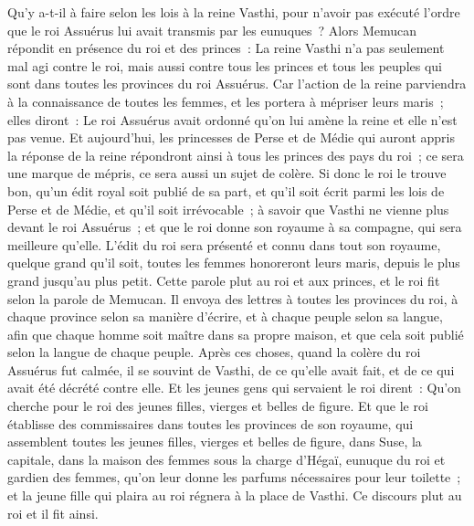 \begin{multicols}{2}
Qu'y a-t-il à faire selon les lois à la reine Vasthi, pour n'avoir pas exécuté l'ordre que le roi Assuérus lui avait transmis par les eunuques~?
Alors Memucan répondit en présence du roi et des princes~: La reine Vasthi n'a pas seulement mal agi contre le roi, mais aussi contre tous les princes et tous les peuples qui sont dans toutes les provinces du roi Assuérus.
Car l'action de la reine parviendra à la connaissance de toutes les femmes, et les portera à mépriser leurs maris~; elles diront~: Le roi Assuérus avait ordonné qu'on lui amène la reine et elle n'est pas venue.
Et aujourd'hui, les princesses de Perse et de Médie qui auront appris la réponse de la reine répondront ainsi à tous les princes des pays du roi~; ce sera une marque de mépris, ce sera aussi un sujet de colère.
Si donc le roi le trouve bon, qu'un édit royal soit publié de sa part, et qu'il soit écrit parmi les lois de Perse et de Médie, et qu'il soit irrévocable~; à savoir que Vasthi ne vienne plus devant le roi Assuérus~; et que le roi donne son royaume à sa compagne, qui sera meilleure qu'elle.
L'édit du roi sera présenté et connu dans tout son royaume, quelque grand qu'il soit, toutes les femmes honoreront leurs maris, depuis le plus grand jusqu'au plus petit.
Cette parole plut au roi et aux princes, et le roi fit selon la parole de Memucan.
Il envoya des lettres à toutes les provinces du roi, à chaque province selon sa manière d'écrire, et à chaque peuple selon sa langue, afin que chaque homme soit maître dans sa propre maison, et que cela soit publié selon la langue de chaque peuple.
\VerseOne{}Après ces choses, quand la colère du roi Assuérus fut calmée, il se souvint de Vasthi, de ce qu'elle avait fait, et de ce qui avait été décrété contre elle.
Et les jeunes gens qui servaient le roi dirent~: Qu'on cherche pour le roi des jeunes filles, vierges et belles de figure.
Et que le roi établisse des commissaires dans toutes les provinces de son royaume, qui assemblent toutes les jeunes filles, vierges et belles de figure, dans Suse, la capitale, dans la maison des femmes sous la charge d'Hégaï, eunuque du roi et gardien des femmes, qu'on leur donne les parfums nécessaires pour leur toilette~;
et la jeune fille qui plaira au roi régnera à la place de Vasthi. Ce discours plut au roi et il fit ainsi.

\end{multicols}
